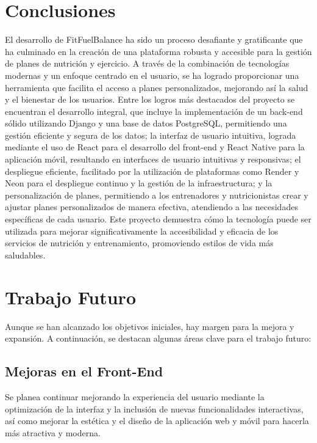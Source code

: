 \label{sec:conclusiones}

\section{Conclusiones}
El desarrollo de FitFuelBalance ha sido un proceso desafiante y gratificante que ha culminado en la creación de una plataforma robusta y accesible para la gestión de planes de nutrición y ejercicio. A través de la combinación de tecnologías modernas y un enfoque centrado en el usuario, se ha logrado proporcionar una herramienta que facilita el acceso a planes personalizados, mejorando así la salud y el bienestar de los usuarios. Entre los logros más destacados del proyecto se encuentran el desarrollo integral, que incluye la implementación de un back-end sólido utilizando Django y una base de datos PostgreSQL, permitiendo una gestión eficiente y segura de los datos; la interfaz de usuario intuitiva, lograda mediante el uso de React para el desarrollo del front-end y React Native para la aplicación móvil, resultando en interfaces de usuario intuitivas y responsivas; el despliegue eficiente, facilitado por la utilización de plataformas como Render y Neon para el despliegue continuo y la gestión de la infraestructura; y la personalización de planes, permitiendo a los entrenadores y nutricionistas crear y ajustar planes personalizados de manera efectiva, atendiendo a las necesidades específicas de cada usuario. Este proyecto demuestra cómo la tecnología puede ser utilizada para mejorar significativamente la accesibilidad y eficacia de los servicios de nutrición y entrenamiento, promoviendo estilos de vida más saludables.

\section{Trabajo Futuro}
Aunque se han alcanzado los objetivos iniciales, hay margen para la mejora y expansión. A continuación, se destacan algunas áreas clave para el trabajo futuro:

\subsection{Mejoras en el Front-End}
Se planea continuar mejorando la experiencia del usuario mediante la optimización de la interfaz y la inclusión de nuevas funcionalidades interactivas, así como mejorar la estética y el diseño de la aplicación web y móvil para hacerla más atractiva y moderna.

